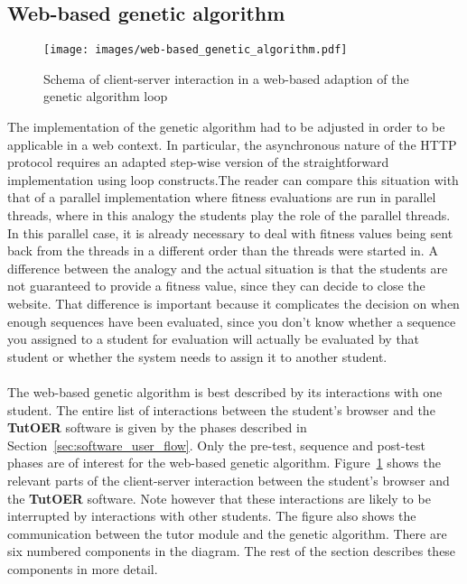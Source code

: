 \subsection{Web-based genetic algorithm}
\label{sec:web-based_ga}
\begin{figure}[ht]
	\centering
	\texttt{[image: images/web-based\_genetic\_algorithm.pdf]}
	\caption[Client-server interaction in web-based adaption of genetic
	algorithm]{Schema of client-server interaction in a web-based adaption of the
	genetic algorithm loop}
	\label{fig:web-based_ga}
\end{figure}
The implementation of the genetic algorithm had to be adjusted in order to be
applicable in a web context. In particular, the asynchronous nature of the HTTP
protocol requires an adapted step-wise version of the straightforward implementation
using loop constructs.The reader can compare this situation with that of a parallel
implementation where fitness evaluations are run in parallel threads, where in
this analogy the students play the role of the parallel threads. In this parallel
case, it is already necessary to deal with fitness values being sent back from the
threads in a different order than the threads were started in. A difference between
the analogy and the actual situation is that the students are not guaranteed to
provide a fitness value, since they can decide to close the website. That
difference is important because it complicates the decision on when enough
sequences have been evaluated, since you don't know whether a sequence you
assigned to a student for evaluation will actually be evaluated by that
student or whether the system needs to assign it to another student.\\\\
\noindent
The web-based genetic algorithm is best described by its interactions with one
student. The entire list of interactions between the student's browser and the
\textbf{TutOER} software is given by the phases described in Section~\ref{sec:software_user_flow}.
Only the pre-test, sequence and post-test phases are of interest for the web-based
genetic algorithm. Figure~\ref{fig:web-based_ga} shows the relevant parts
of the client-server interaction between the student's browser and the \textbf{TutOER}
software. Note however that these interactions are likely to be interrupted by
interactions with other students. The figure also shows the communication between
the tutor module and the genetic algorithm. There are six numbered components
in the diagram. The rest of the section describes these components in more
detail.

